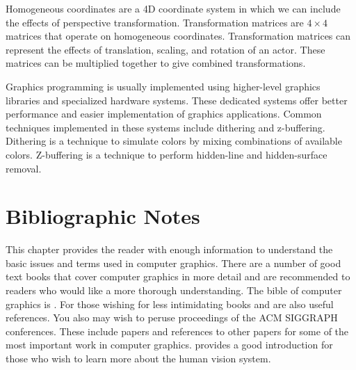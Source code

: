 Homogeneous coordinates are a 4D coordinate system in which we can include the effects of perspective transformation. Transformation matrices are \(4 \times 4\) matrices that operate on homogeneous coordinates. Transformation matrices can represent the effects of translation, scaling, and rotation of an actor. These matrices can be multiplied together to give combined transformations.

Graphics programming is usually implemented using higher-level graphics libraries and specialized hardware systems. These dedicated systems offer better performance and easier implementation of graphics applications. Common techniques implemented in these systems include dithering and z-buffering. Dithering is a technique to simulate colors by mixing combinations of available colors. Z-buffering is a technique to perform hidden-line and hidden-surface removal.

\section{Bibliographic Notes}
\label{Ch03BibNotes}

This chapter provides the reader with enough information to understand the basic issues and terms used in computer graphics. There are a number of good text books that cover computer graphics in more detail and are recommended to readers who would like a more thorough understanding. The bible of computer graphics is \cite{FoleyVanDam90}. For those wishing for less intimidating books \cite{BurgerGillies89} and \cite{Watt93} are also useful references. You also may wish to peruse proceedings of the ACM SIGGRAPH conferences. These include papers and references to other papers for some of the most important work in computer graphics. \cite{Carlson85} provides a good introduction for those who wish to learn more about the human vision system.


\printbibliography


